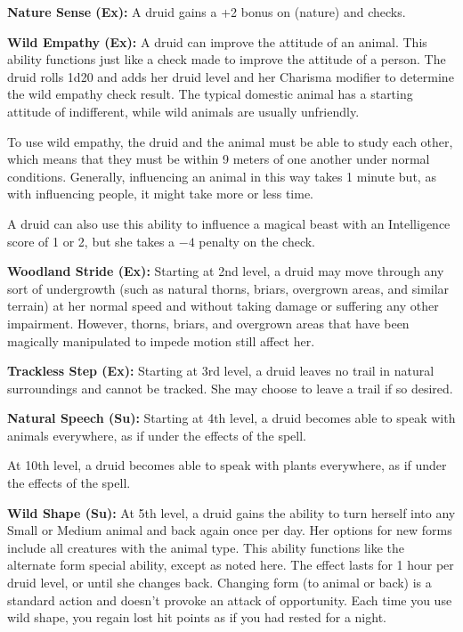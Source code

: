 \textbf{Nature Sense (Ex):} A druid gains a +2 bonus on  (nature) and  checks.

\textbf{Wild Empathy (Ex):} A druid can improve the attitude of an animal. This ability functions just like a  check made to improve the attitude of a person. The druid rolls 1d20 and adds her druid level and her Charisma modifier to determine the wild empathy check result. The typical domestic animal has a starting attitude of indifferent, while wild animals are usually unfriendly.

To use wild empathy, the druid and the animal must be able to study each other, which means that they must be within 9 meters of one another under normal conditions. Generally, influencing an animal in this way takes 1 minute but, as with influencing people, it might take more or less time.

A druid can also use this ability to influence a magical beast with an Intelligence score of 1 or 2, but she takes a $-4$ penalty on the check.

\textbf{Woodland Stride (Ex):} Starting at 2nd level, a druid may move through any sort of undergrowth (such as natural thorns, briars, overgrown areas, and similar terrain) at her normal speed and without taking damage or suffering any other impairment. However, thorns, briars, and overgrown areas that have been magically manipulated to impede motion still affect her.

\textbf{Trackless Step (Ex):} Starting at 3rd level, a druid leaves no trail in natural surroundings and cannot be tracked. She may choose to leave a trail if so desired.

\textbf{Natural Speech (Su):} Starting at 4th level, a druid becomes able to speak with animals everywhere, as if under the effects of the  spell.

At 10th level, a druid becomes able to speak with plants everywhere, as if under the effects of the  spell.

\textbf{Wild Shape (Su):} At 5th level, a druid gains the ability to turn herself into any Small or Medium animal and back again once per day. Her options for new forms include all creatures with the animal type. This ability functions like the alternate form special ability, except as noted here. The effect lasts for 1 hour per druid level, or until she changes back. Changing form (to animal or back) is a standard action and doesn't provoke an attack of opportunity. Each time you use wild shape, you regain lost hit points as if you had rested for a night.

